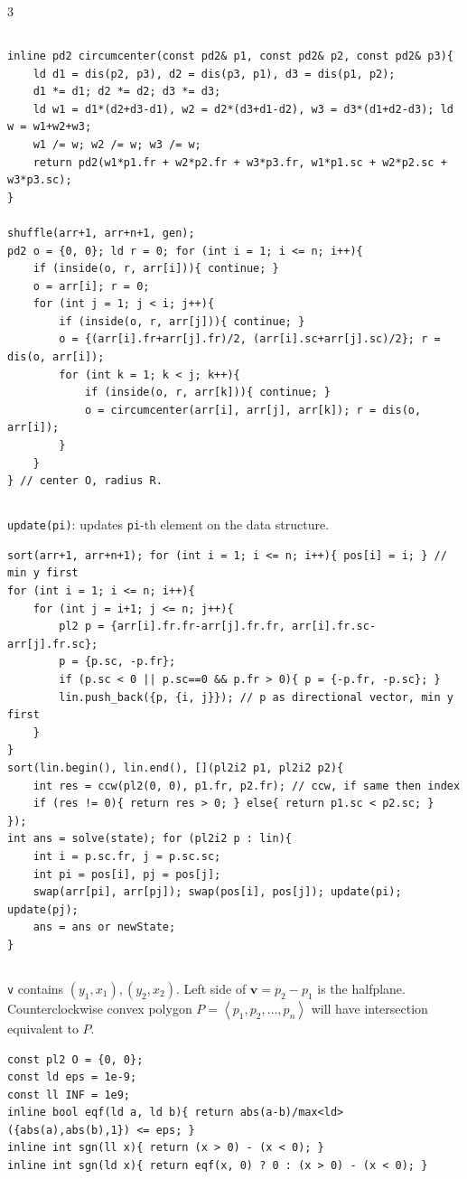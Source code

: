 \documentclass[landscape, 8pt, a4paper, oneside]{extarticle}
\begin{document}
\begin{multicols*}{3}
\subsection{}
\begin{verbatim}
inline pd2 circumcenter(const pd2& p1, const pd2& p2, const pd2& p3){
	ld d1 = dis(p2, p3), d2 = dis(p3, p1), d3 = dis(p1, p2);
	d1 *= d1; d2 *= d2; d3 *= d3;
	ld w1 = d1*(d2+d3-d1), w2 = d2*(d3+d1-d2), w3 = d3*(d1+d2-d3); ld w = w1+w2+w3;
	w1 /= w; w2 /= w; w3 /= w;
	return pd2(w1*p1.fr + w2*p2.fr + w3*p3.fr, w1*p1.sc + w2*p2.sc + w3*p3.sc);
}

shuffle(arr+1, arr+n+1, gen);
pd2 o = {0, 0}; ld r = 0; for (int i = 1; i <= n; i++){
	if (inside(o, r, arr[i])){ continue; }
	o = arr[i]; r = 0;
	for (int j = 1; j < i; j++){
		if (inside(o, r, arr[j])){ continue; }
		o = {(arr[i].fr+arr[j].fr)/2, (arr[i].sc+arr[j].sc)/2}; r = dis(o, arr[i]);
		for (int k = 1; k < j; k++){
			if (inside(o, r, arr[k])){ continue; }
			o = circumcenter(arr[i], arr[j], arr[k]); r = dis(o, arr[i]);
		}
	}
} // center O, radius R.
\end{verbatim}
\subsection{}
\texttt{update(pi)}: updates \texttt{pi}-th element on the data structure.
\begin{verbatim}
sort(arr+1, arr+n+1); for (int i = 1; i <= n; i++){ pos[i] = i; } // min y first
for (int i = 1; i <= n; i++){
	for (int j = i+1; j <= n; j++){
		pl2 p = {arr[i].fr.fr-arr[j].fr.fr, arr[i].fr.sc-arr[j].fr.sc};
		p = {p.sc, -p.fr};
		if (p.sc < 0 || p.sc==0 && p.fr > 0){ p = {-p.fr, -p.sc}; }
		lin.push_back({p, {i, j}}); // p as directional vector, min y first
	}
}
sort(lin.begin(), lin.end(), [](pl2i2 p1, pl2i2 p2){
	int res = ccw(pl2(0, 0), p1.fr, p2.fr); // ccw, if same then index
	if (res != 0){ return res > 0; } else{ return p1.sc < p2.sc; }
});
int ans = solve(state); for (pl2i2 p : lin){
	int i = p.sc.fr, j = p.sc.sc;
	int pi = pos[i], pj = pos[j];
	swap(arr[pi], arr[pj]); swap(pos[i], pos[j]); update(pi); update(pj);
	ans = ans or newState;
}
\end{verbatim}
\subsection{}
\texttt{v} contains $(y_1, x_1), (y_2, x_2)$. Left side of $\mathbf{v} = p_2 - p_1$ is the halfplane.
Counterclockwise convex polygon $P = \left< p_1, p_2, \ldots, p_n \right>$ will have intersection equivalent to $P$.
\begin{verbatim}
const pl2 O = {0, 0};
const ld eps = 1e-9;
const ll INF = 1e9;
inline bool eqf(ld a, ld b){ return abs(a-b)/max<ld>({abs(a),abs(b),1}) <= eps; }
inline int sgn(ll x){ return (x > 0) - (x < 0); }
inline int sgn(ld x){ return eqf(x, 0) ? 0 : (x > 0) - (x < 0); }


\end{verbatim}
\end{multicols*}
\end{document}

